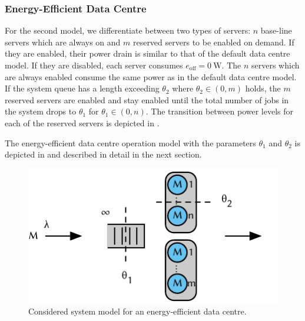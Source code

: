 \subsubsection*{Energy-Efficient Data Centre}\label{sec:cloud:data_centers:problem_formulation:energy_efficient_data_center}
For the second model, we differentiate between two types of servers:
\(n\) base-line servers which are always on and \(m\) reserved servers to be enabled on demand.
If they are enabled, their power drain is similar to that of the default data centre model.
If they are disabled, each server consumes \(e_\text{off} = \SI{0}{\watt}\).
The \(n\) servers which are always enabled consume the same power as in the default data centre model.
If the system queue has a length exceeding \(\theta_2\) where \(\theta_2 \in (0, m)\) holds, the \(m\) reserved servers are enabled and stay enabled until the total number of jobs in the system drops to \(\theta_1\) for \(\theta_1 \in (0, n)\).
The transition between power levels for each of the reserved servers is depicted in .

The energy-efficient data centre operation model with the parameters \(\theta_1\) and \(\theta_2\) is depicted in  and described in detail in the next section.

\begin{figure}
  \centering
  \includegraphics{cloud/data_centers/problem_formulation/figures/model}
  \caption{Considered system model for an energy-efficient data centre.}
  \label{fig:cloud:data_centers:problem_formulation:model}
\end{figure}